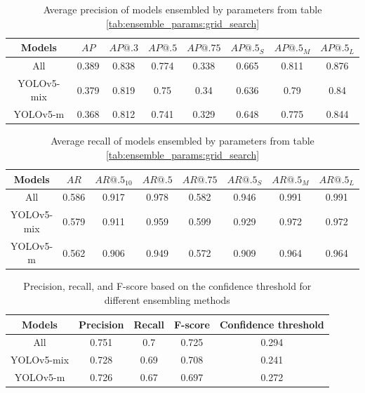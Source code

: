 \begin{table}[h]
    \centering
    \begin{tabular}{|c|c|c|c|c|c|c|c|}
        \hline
        Models     & $AP$  & $AP@.3$ & $AP@.5$ & $AP@.75$ & $AP@.5_S$ & $AP@.5_M$ & $AP@.5_L$ \\ \hline
        All        & 0.389 & 0.838   & 0.774   & 0.338    & 0.665     & 0.811     & 0.876     \\ \hline
        YOLOv5-mix & 0.379 & 0.819   & 0.75    & 0.34     & 0.636     & 0.79      & 0.84      \\ \hline
        YOLOv5-m   & 0.368 & 0.812   & 0.741   & 0.329    & 0.648     & 0.775     & 0.844     \\ \hline
    \end{tabular}
    \caption{Average precision of models ensembled by parameters from table \ref{tab:ensemble_params:grid_search}}
    \label{tab:precision:ensemble_compare}
\end{table}


\begin{table}[h]
    \centering
    \begin{tabular}{|c|c|c|c|c|c|c|c|}
        \hline
        Models     & $AR$  & $AR@.5_{10}$ & $AR@.5$ & $AR@.75$ & $AR@.5_S$ & $AR@.5_M$ & $AR@.5_L$ \\ \hline
        All        & 0.586 & 0.917        & 0.978   & 0.582    & 0.946     & 0.991     & 0.991     \\ \hline
        YOLOv5-mix & 0.579 & 0.911        & 0.959   & 0.599    & 0.929     & 0.972     & 0.972     \\ \hline
        YOLOv5-m   & 0.562 & 0.906        & 0.949   & 0.572    & 0.909     & 0.964     & 0.964     \\ \hline
    \end{tabular}
    \caption{Average recall of models ensembled by parameters from table \ref{tab:ensemble_params:grid_search}}
    \label{tab:recall:ensemble_compare}
\end{table}


\begin{table}[h]
    \begin{tabular}{|c|c|c|c|c|}
        \hline
        Models     & Precision & Recall & F-score & Confidence threshold \\ \hline
        All        & 0.751     & 0.7    & 0.725   & 0.294                \\ \hline
        YOLOv5-mix & 0.728     & 0.69   & 0.708   & 0.241                \\ \hline
        YOLOv5-m   & 0.726     & 0.67   & 0.697   & 0.272                \\ \hline
    \end{tabular}
    \caption{Precision, recall, and F-score based on the confidence threshold for different ensembling methods}
    \label{tab:ensembling_prf:ensemble compare}
\end{table}

